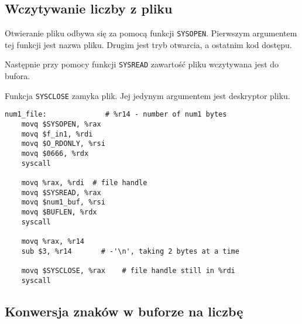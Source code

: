 \documentclass[polish, 11pt]{article}
\begin{document}
	\subsection{Wczytywanie liczby z pliku}
	
		\begin{minipage}{.4\textwidth}
			Otwieranie pliku odbywa się za pomocą funkcji \texttt{SYSOPEN}.
			Pierwszym argumentem tej funkcji jest nazwa pliku.
			Drugim jest tryb otwarcia, a ostatnim kod dostępu.

			Następnie przy pomocy funkcji \texttt{SYSREAD} zawartość pliku wczytywana jest do bufora.

			Funkcja \texttt{SYSCLOSE} zamyka plik. Jej jedynym argumentem jest deskryptor pliku.

		\end{minipage}%
		\hspace{1cm}
		\begin{minipage}{.5\textwidth}	%
			\begin{lstlisting}	
num1_file:              # %r14 - number of num1 bytes
	movq $SYSOPEN, %rax
	movq $f_in1, %rdi
	movq $O_RDONLY, %rsi
	movq $0666, %rdx
	syscall

	movq %rax, %rdi  # file handle
	movq $SYSREAD, %rax
	movq $num1_buf, %rsi
	movq $BUFLEN, %rdx
	syscall

	movq %rax, %r14  
	sub $3, %r14       # -'\n', taking 2 bytes at a time

	movq $SYSCLOSE, %rax    # file handle still in %rdi
	syscall

			\end{lstlisting}	%
		\end{minipage}


	\subsection{Konwersja znaków w buforze na liczbę}
	
\end{document}
